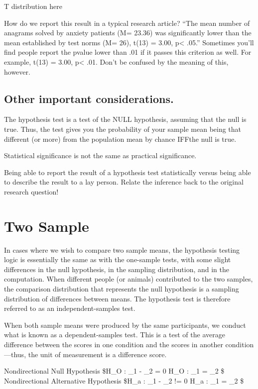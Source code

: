 \documentclass[]{book}
\theoremstyle{definition}
\theoremstyle{definition}
\theoremstyle{definition}
\theoremstyle{remark}
\begin{document}
T distribution here

How do we report this result in a typical research article? ``The mean
number of anagrams solved by anxiety patients (M= 23.36) was
significantly lower than the mean established by test norms (M= 26),
t(13) = 3.00, p\textless{} .05.'' Sometimes you'll find people report
the pvalue lower than .01 if it passes this criterion as well. For
example, t(13) = 3.00, p\textless{} .01. Don't be confused by the
meaning of this, however.

\subsection{Other important
considerations.}\label{other-important-considerations.}

The hypothesis test is a test of the NULL hypothesis, assuming that the
null is true. Thus, the test gives you the probability of your sample
mean being that different (or more) from the population mean by chance
IFFthe null is true.

Statistical significance is not the same as practical significance.

Being able to report the result of a hypothesis test statistically
versus being able to describe the result to a lay person. Relate the
inference back to the original research question!

\section{Two Sample}\label{two-sample}

In cases where we wish to compare two sample means, the hypothesis
testing logic is essentially the same as with the one-sample tests, with
some slight differences in the null hypothesis, in the sampling
distribution, and in the computation. When different people (or animals)
contributed to the two samples, the comparison distribution that
represents the null hypothesis is a sampling distribution of differences
between means. The hypothesis test is therefore referred to as an
independent-samples test.

When both sample means were produced by the same participants, we
conduct what is known as a dependent-samples test. This is a test of the
average difference between the scores in one condition and the scores in
another condition---thus, the unit of measurement is a difference score.

Nondirectional Null Hypothesis \$H\_O : \mu\_1 - \mu\_2 = 0 \textbar{}
H\_O : \mu\_1 = \mu\_2 \$ Nondirectional Alternative Hypothesis \$H\_a :
\mu\_1 - \mu\_2 != 0 \textbar{} H\_a : \mu\_1 = \mu\_2 \$
\end{document}
